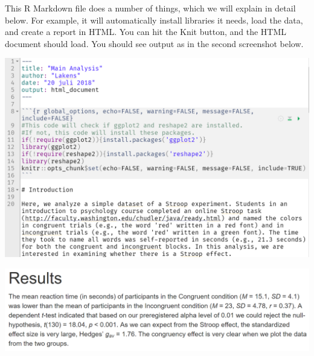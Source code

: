 \documentclass[
  oneside]{book}
\begin{document}
This R Markdown file does a number of things, which we will explain in detail
below. For example, it will automatically install libraries it needs, load the
data, and create a report in HTML. You can hit the Knit button, and the HTML
document should load. You should see output as in the second screenshot below.

\begin{center}\includegraphics[width=1\linewidth]{images/23a19f01f3a23b3673656ee78860caf5} \end{center}

\begin{center}\includegraphics[width=1\linewidth]{images/79166b6bcc909e9e9e7fb0dd365fc8b2} \end{center}
\end{document}
